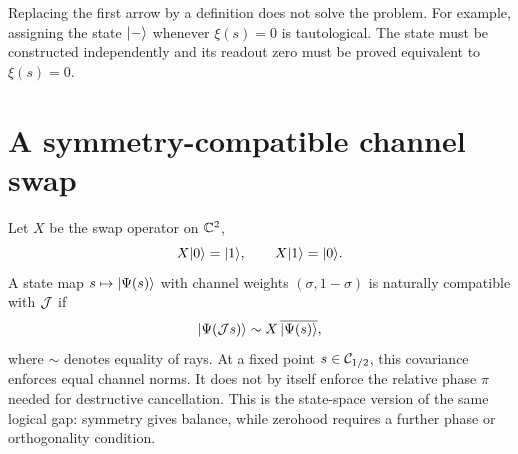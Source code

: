 \begin{warning}
Replacing the first arrow by a definition does not solve the problem. For example, assigning the state $\lvert -\rangle$ whenever $\xi(s)=0$ is tautological. The state must be constructed independently and its readout zero must be proved equivalent to $\xi(s)=0$.
\end{warning}

\section{A symmetry-compatible channel swap}

Let $X$ be the swap operator on $\mathbb{C}^2$,
\[
 X\lvert 0\rangle=\lvert 1\rangle,\qquad X\lvert 1\rangle=\lvert 0\rangle.
\]
A state map $s\mapsto\lvert \Psi(s)\rangle$ with channel weights $(\sigma,1-\sigma)$ is naturally compatible with $\mathcal{J}$ if
\begin{equation}
 \lvert \Psi(\mathcal{J} s)\rangle\sim X\,\overline{\lvert \Psi(s)\rangle},
 \label{eq:state-covariance-preview}
\end{equation}
where $\sim$ denotes equality of rays. At a fixed point $s\in\mathcal{C}_{1/2}$, this covariance enforces equal channel norms. It does not by itself enforce the relative phase $\pi$ needed for destructive cancellation. This is the state-space version of the same logical gap: symmetry gives balance, while zerohood requires a further phase or orthogonality condition.

